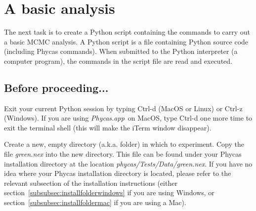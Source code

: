 \documentclass[10pt]{article}
\newcommand{\pathname}[1]{{\em #1}}			%
\newcommand{\keycmd}[1]{{\sf #1}}			%
\newcommand{\phycasapp}{\pathname{Phycas.app}}
\begin{document}
\section{A basic analysis} \label{sec:basic}

The next task is to create a Python script containing the commands to carry out a basic MCMC analysis. A Python script is a file containing Python source code (including Phycas commands). When submitted to the Python interpreter (a computer program), the commands in the script file are read and executed.  

\subsection{Before proceeding...}
Exit your current Python session by typing \keycmd{Ctrl-d} (MacOS or Linux) or \keycmd{Ctrl-z} (Windows). If you are using \phycasapp\ on MacOS, type \keycmd{Ctrl-d} one more time to exit the terminal shell (this will make the iTerm window disappear). 

Create a new, empty directory (a.k.a. folder) in which to experiment. Copy the file \pathname{green.nex} into the new directory. This file can be found under your Phycas installation directory at the location \pathname{phycas/Tests/Data/green.nex}. If you have no idea where your Phycas installation directory is located, please refer to the relevant subsection of the installation instructions (either section~\ref{subsubsec:installfolderwindows} if you are using Windows, or section~\ref{subsubsec:installfoldermac} if you are using a Mac).

\end{document}

